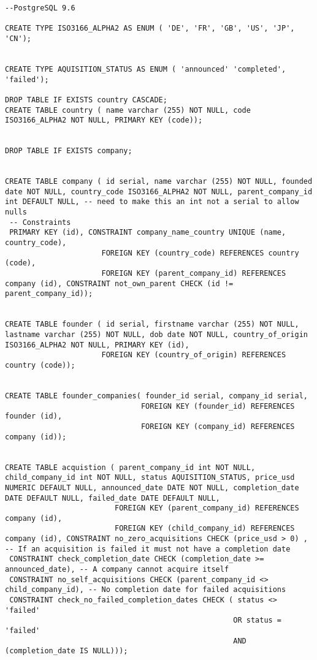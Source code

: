 \documentclass[12pt]{article}
\begin{document}
\begin{verbatim}
--PostgreSQL 9.6

CREATE TYPE ISO3166_ALPHA2 AS ENUM ( 'DE', 'FR', 'GB', 'US', 'JP', 'CN');


CREATE TYPE AQUISITION_STATUS AS ENUM ( 'announced' 'completed', 'failed');

DROP TABLE IF EXISTS country CASCADE;
CREATE TABLE country ( name varchar (255) NOT NULL, code ISO3166_ALPHA2 NOT NULL, PRIMARY KEY (code));


DROP TABLE IF EXISTS company;


CREATE TABLE company ( id serial, name varchar (255) NOT NULL, founded date NOT NULL, country_code ISO3166_ALPHA2 NOT NULL, parent_company_id int DEFAULT NULL, -- need to make this an int not a serial to allow nulls
 -- Constraints
 PRIMARY KEY (id), CONSTRAINT company_name_country UNIQUE (name, country_code),
                      FOREIGN KEY (country_code) REFERENCES country (code),
                      FOREIGN KEY (parent_company_id) REFERENCES company (id), CONSTRAINT not_own_parent CHECK (id != parent_company_id));


CREATE TABLE founder ( id serial, firstname varchar (255) NOT NULL, lastname varchar (255) NOT NULL, dob date NOT NULL, country_of_origin ISO3166_ALPHA2 NOT NULL, PRIMARY KEY (id),
                      FOREIGN KEY (country_of_origin) REFERENCES country (code));


CREATE TABLE founder_companies( founder_id serial, company_id serial,
                               FOREIGN KEY (founder_id) REFERENCES founder (id),
                               FOREIGN KEY (company_id) REFERENCES company (id));


CREATE TABLE acquistion ( parent_company_id int NOT NULL, child_company_id int NOT NULL, status AQUISITION_STATUS, price_usd NUMERIC DEFAULT NULL, announced_date DATE NOT NULL, completion_date DATE DEFAULT NULL, failed_date DATE DEFAULT NULL,
                         FOREIGN KEY (parent_company_id) REFERENCES company (id),
                         FOREIGN KEY (child_company_id) REFERENCES company (id), CONSTRAINT no_zero_acquisitions CHECK (price_usd > 0) , -- If an acquisition is failed it must not have a completion date
 CONSTRAINT check_completion_date CHECK (completion_date >= announced_date), -- A company cannot acquire itself
 CONSTRAINT no_self_acquisitions CHECK (parent_company_id <> child_company_id), -- No completion date for failed acquisitions
 CONSTRAINT check_no_failed_completion_dates CHECK ( status <> 'failed'
                                                    OR status = 'failed'
                                                    AND (completion_date IS NULL)));



\end{verbatim}
\end{document}

